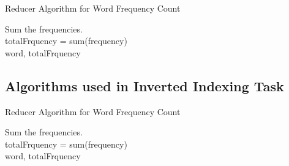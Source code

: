\documentclass[10pt, onecolumn]{article}
\begin{document}
\begin{algorithm}[H]
   \label{Alg:ReducerWordCount}
    \caption{Reducer Algorithm for Word Frequency Count}
    Sum the frequencies.\\
    totalFrquency = sum(frequency)\\
    \Return word, totalFrquency
\end{algorithm}

\subsection{Algorithms used in Inverted Indexing Task}
\begin{algorithm}[H]
   \label{Alg:ReducerInvertedIndexing}
    \caption{Reducer Algorithm for Word Frequency Count}
    Sum the frequencies.\\
    totalFrquency = sum(frequency)\\
    \Return word, totalFrquency
\end{algorithm}
\end{document}
